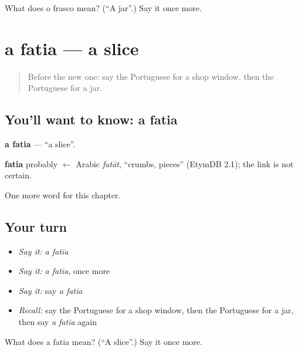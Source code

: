 \begin{tcolorbox}[breakable,colback=teal!4,colframe=teal!35!black,title={Before you move on}]
What does o frasco mean? (\textquotedblleft{}A jar\textquotedblright{}.) Say it once more.
\end{tcolorbox}
\section[a fatia]{a fatia — a slice}

\label{lesson:PT-C228-fatia}



\begin{quote}
Before the new one: say the Portuguese for a shop window, then the Portuguese for a jar.
\end{quote}

\subsection*{You'll want to know: a fatia}
\textbf{a fatia} — \textquotedblleft{}a slice\textquotedblright{}.

\begin{cousinweb}
\textbf{fatia} probably $\leftarrow$ Arabic \emph{futāt}, \textquotedblleft{}crumbs, pieces\textquotedblright{} (EtymDB 2.1); the link is not certain.
\end{cousinweb}

\begin{grammarlens}[title={What you've built}]
One more word for this chapter.
\end{grammarlens}

\subsection*{Your turn}
\begin{itemize}
\raggedright
  \item \emph{Say it:} \emph{a fatia}
  \item \emph{Say it:} \emph{a fatia}, once more
  \item \emph{Say it:} say \emph{a fatia}
  \item \emph{Recall:} say the Portuguese for a shop window, then the Portuguese for a jar, then say \emph{a fatia} again
\end{itemize}

\begin{tcolorbox}[breakable,colback=teal!4,colframe=teal!35!black,title={Before you move on}]
What does a fatia mean? (\textquotedblleft{}A slice\textquotedblright{}.) Say it once more.
\end{tcolorbox}
